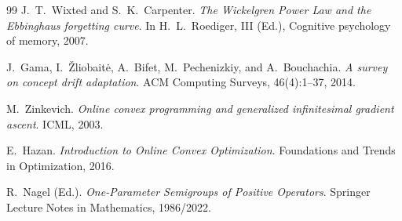 \documentclass[11pt,a4paper]{article}
\theoremstyle{remark}
\begin{document}
\begin{thebibliography}{99}
J.~T.~Wixted and S.~K.~Carpenter.
\emph{The Wickelgren Power Law and the Ebbinghaus forgetting curve}.
In H.~L.~Roediger, III (Ed.), Cognitive psychology of memory, 2007.

J.~Gama, I.~Žliobaitė, A.~Bifet, M.~Pechenizkiy, and A.~Bouchachia.
\emph{A survey on concept drift adaptation}.
ACM Computing Surveys, 46(4):1--37, 2014.

M.~Zinkevich.
\emph{Online convex programming and generalized infinitesimal gradient ascent}.
ICML, 2003.

E.~Hazan.
\emph{Introduction to Online Convex Optimization}.
Foundations and Trends in Optimization, 2016.

R.~Nagel (Ed.).
\emph{One-Parameter Semigroups of Positive Operators}.
Springer Lecture Notes in Mathematics, 1986/2022.

\end{thebibliography}
\end{document}
